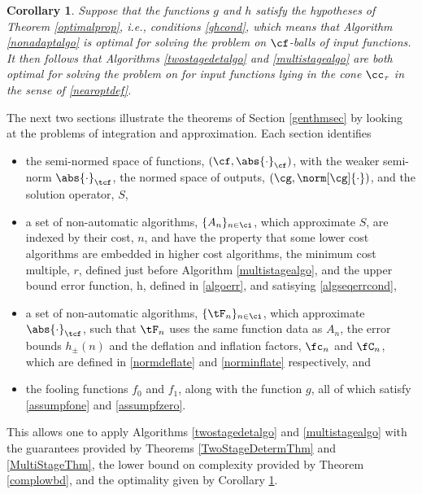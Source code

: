 \documentclass[]{elsarticle}
\newtheorem{cor}{Corollary}
\theoremstyle{definition}
\theoremstyle{remark}
\newcommand{\Fnorm}[1]{\abs{#1}_{\cf}}
\newcommand{\Ftnorm}[1]{\abs{#1}_{\tcf}}
\newcommand{\Gnorm}[1]{\norm[\cg]{#1}}
\begin{document}
\begin{cor} \label{optimcor}
Suppose that the functions $g$ and $h$ satisfy the hypotheses of Theorem \ref{optimalprop}, i.e., conditions \eqref{ghcond}, which means that Algorithm \ref{nonadaptalgo} is optimal for solving the problem on $\cf$-balls of input functions.  It then follows that Algorithms \ref{twostagedetalgo} and \ref{multistagealgo} are both optimal for solving the  problem on for input functions lying in the cone $\cc_{\tau}$ in the sense of \eqref{nearoptdef}.  
\end{cor}

\vspace{0.5cm}

The next two sections illustrate the theorems of Section \ref{genthmsec} by looking at the problems of integration and approximation.  Each section identifies 

\begin{itemize}

\item the semi-normed space of functions, $(\cf,\Fnorm{\cdot})$, with the weaker semi-norm $\Ftnorm{\cdot}$, the normed space of outputs, $(\cg,\Gnorm{\cdot})$, and the solution operator, $S$,

\item a set of non-automatic algorithms, $\{A_n\}_{n \in \ci}$, which approximate $S$, are indexed by their cost, $n$, and have the property that some lower cost algorithms are embedded in higher cost algorithms,  the minimum cost multiple, $r$, defined just before Algorithm \ref{multistagealgo}, and the upper bound error function, h, defined in \eqref{algoerr}, and satisying \eqref{algseqerrcond},

\item a set of non-automatic algorithms, $\{\tF_n\}_{n \in \ci}$, which approximate $\Ftnorm{\cdot}$, such that $\tF_n$ uses the same function data as $A_n$, the error bounds $h_{\pm}(n)$ and the deflation and inflation factors, $\fc_n$ and $\fC_n$, which are defined in \eqref{normdeflate} and \eqref{norminflate} respectively, and

\item the fooling functions $f_0$ and $f_1$, along with the function $g$, all of which satisfy \eqref{assumpfone} and \eqref{assumpfzero}.

\end{itemize}
This allows one to apply Algorithms \ref{twostagedetalgo} and \ref{multistagealgo} with the guarantees provided by Theorems \ref{TwoStageDetermThm} and \ref{MultiStageThm}, the lower bound on complexity provided by Theorem \ref{complowbd}, and the optimality given by Corollary \ref{optimcor}.
\end{document}
